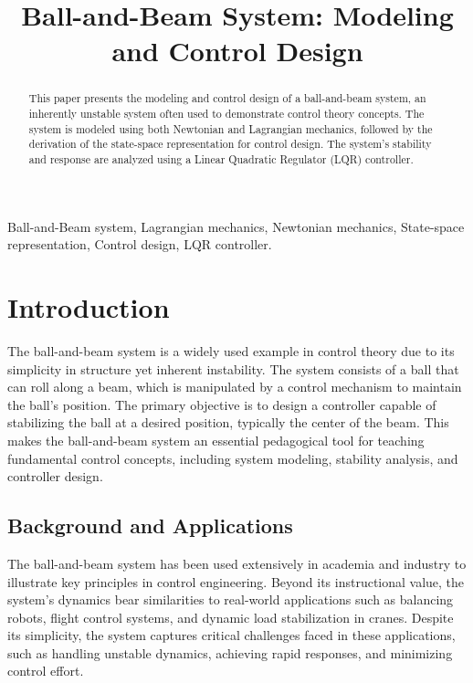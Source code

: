 \documentclass[conference]{IEEEtran}
\begin{document}
\title{Ball-and-Beam System: Modeling and Control Design}

\author{
}

\maketitle

\begin{abstract}
This paper presents the modeling and control design of a ball-and-beam system, an inherently unstable system often used to demonstrate control theory concepts. The system is modeled using both Newtonian and Lagrangian mechanics, followed by the derivation of the state-space representation for control design. The system's stability and response are analyzed using a Linear Quadratic Regulator (LQR) controller.
\end{abstract}

\begin{IEEEkeywords}
Ball-and-Beam system, Lagrangian mechanics, Newtonian mechanics, State-space representation, Control design, LQR controller.
\end{IEEEkeywords}

\section{Introduction}

The ball-and-beam system is a widely used example in control theory due to its simplicity in structure yet inherent instability. The system consists of a ball that can roll along a beam, which is manipulated by a control mechanism to maintain the ball's position. The primary objective is to design a controller capable of stabilizing the ball at a desired position, typically the center of the beam. This makes the ball-and-beam system an essential pedagogical tool for teaching fundamental control concepts, including system modeling, stability analysis, and controller design.

\subsection{Background and Applications}

The ball-and-beam system has been used extensively in academia and industry to illustrate key principles in control engineering. Beyond its instructional value, the system's dynamics bear similarities to real-world applications such as balancing robots, flight control systems, and dynamic load stabilization in cranes. Despite its simplicity, the system captures critical challenges faced in these applications, such as handling unstable dynamics, achieving rapid responses, and minimizing control effort.
\end{document}
